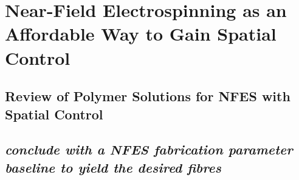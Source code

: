 
\chapter{Near-Field Electrospinning as an Affordable Way to Gain Spatial Control} %

\label{Chapter:3}

\section{Review of Polymer Solutions for NFES with Spatial Control}



\section{\emph{conclude with a NFES fabrication parameter baseline to yield the desired fibres}}